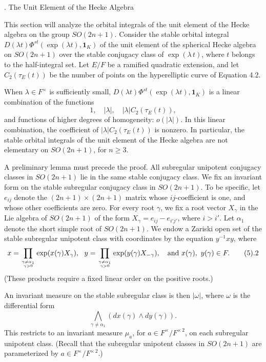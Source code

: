 . The Unit Element of the Hecke Algebra\endhead


This section will analyze the orbital integrals of the unit element
of the Hecke algebra on the group $SO(2n+1)$.
Consider the stable orbital integral 
$D(\lambda t)\Phi^{st}
(\exp(\lambda t),{\pmb 1}_K)$
 of the unit element of
the spherical Hecke algebra on $SO(2n+1)$
over the stable conjugacy class of $\exp(\lambda\,t)$,
where $t$ belongs to the half-integral set.
  Let
$E/F$ be a ramified quadratic extension, and let
$C_2(\tau_E(t))$ be the number of points on the
hyperelliptic curve of Equation 4.2.

 When $\lambda\in F^\times$ is sufficiently small,
$D(\lambda t)\Phi^{st}
(\exp(\lambda t),{\pmb 1}_K)$ is
a linear combination of the functions
$$1,\quad |\lambda|,\quad |\lambda| C_2(\tau_E(t)),$$
and functions of higher degrees of homogeneity: $o(|\lambda|)$.
In this linear combination, the coefficient of $|\lambda|C_2(\tau_E(t))$
is nonzero.  In particular, the stable orbital integrals of the
unit element of the Hecke algebra are not elementary
on $SO(2n+1)$, for $n\ge 3$.
\endproclaim

A preliminary lemma must precede the proof.
All subregular unipotent conjugacy
classes in $SO(2n+1)$ lie in the same stable conjugacy
class.  We fix an invariant form on the
stable subregular conjugacy class in $SO(2n+1)$.  To be
specific, let $e_{ij}$ denote the $(2n+1)\times(2n+1)$ matrix
whose ${ij}$-coefficient is one, and whose other coefficients
are zero. For every root $\gamma$, we
fix a root vector $X_\gamma$
in the Lie algebra of
$SO(2n+1)$ of the form $X_\gamma=e_{ij} - e_{i'j'}$, where
$i>i'$.  Let $\alpha_1$ denote the short simple root of $SO(2n+1)$.
We endow a Zariski open set of the stable subregular
unipotent class with coordinates by the equation $y^{-1} x y$, where 
$$x = \prod_{\gamma\ne\alpha_1\atop \gamma>0} \exp(
x(\gamma) X_\gamma),\ \ 
y = \prod_{\gamma\ne\alpha_1\atop\gamma>0}\exp(
y(\gamma) X_{-\gamma}),\quad\hbox{and } x(\gamma),\ y(\gamma)\in F.\tag5.2$$
  (These
products require a fixed linear order on the positive roots.)

An invariant measure on the stable subregular class is then
$|\omega|$, where $\omega$ is the differential form
$$\bigwedge_{\gamma\ne\alpha_1} (dx(\gamma)\wedge dy(\gamma)).$$
This restricts to
an invariant measure $\mu_a$, for $a\in F^\times/
F^{\times\,2}$, on each subregular unipotent class.  
(Recall that the subregular unipotent classes in $SO(2n+1)$
are parameterized by $a\in F^\times/F^{\times\,2}$.)

